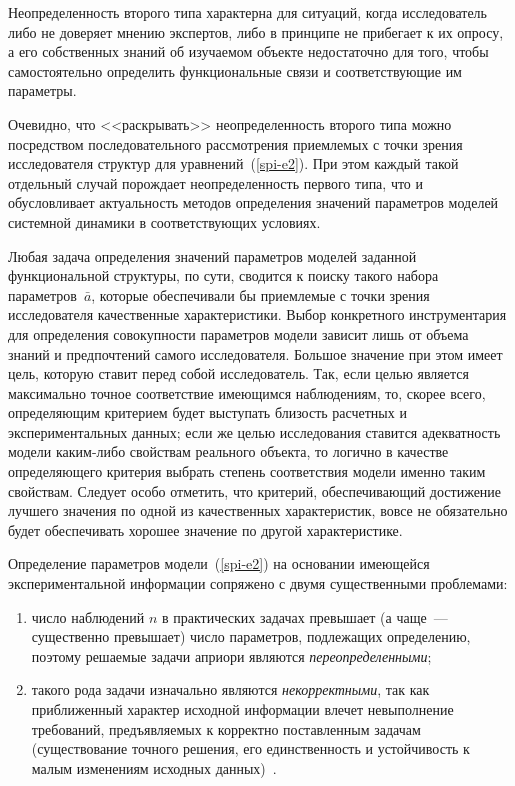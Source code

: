 {\begin{multicols}{2}
  Неопределенность второго типа характерна для ситуаций, когда
исследователь либо не доверяет мнению экспертов, либо в принципе не
прибегает к их опросу, а его собственных знаний об изучаемом объекте
недостаточно для того, чтобы самостоятельно определить функциональные
связи и соответствующие им параметры.

  Очевидно, что <<раскрывать>> неопределенность второго типа можно
посредством последовательного рассмотрения приемлемых с точки зрения
исследователя структур для уравнений~(\ref{spi-e2}). При этом каждый такой
отдельный случай порождает неопределенность первого типа, что и
обусловливает актуальность методов определения значений параметров
моделей системной динамики в соответствующих условиях.

  Любая задача определения значений параметров моделей заданной
функциональной структуры, по сути, сводится к поиску такого набора
па\-ра\-мет\-ров~$\bar{a}$, которые обеспечивали бы приемлемые с точки зрения
исследователя качественные характеристики. Выбор конкретного
инструментария для определения совокупности параметров модели зависит
лишь от объема знаний и предпочтений самого исследователя. Большое
значение при этом имеет цель, которую ставит перед собой исследователь. Так,
если целью является максимально точное соответствие имеющимся
наблюдениям, то, скорее всего, определяющим критерием будет выступать
близость расчетных и экспериментальных данных; если же целью исследования
ставится адекватность модели каким-либо свойствам реального объекта, то
логично в качестве определяющего критерия выбрать степень соответствия
модели именно таким свойствам. Следует особо отметить, что критерий,
обеспечивающий достижение лучшего значения по одной из качественных
характеристик, вовсе не обязательно будет обеспечивать хорошее значение по
другой характеристике.

  Определение параметров модели~(\ref{spi-e2}) на основании имеющейся
экспериментальной информации сопряжено с двумя существенными
проблемами:
  \begin{enumerate}[(1)]
  \item число наблюдений $n$ в практических задачах превышает (а чаще~---
существенно превышает) число параметров, подлежащих определению,
поэтому решаемые задачи априори являются \textit{переопределенными};
 \item такого рода задачи изначально являются \textit{некорректными}, так как
приближенный характер исходной информации влечет невыполнение
требований, предъявляемых к корректно поставленным задачам
(существование точного решения, его единственность и устойчивость к малым
изменениям исходных данных)~\cite{spi-5}.
\end{enumerate}


\end{multicols}}
